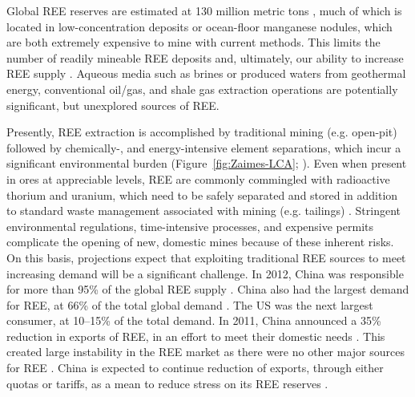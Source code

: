 Global REE reserves are estimated at 130 million metric tons \citep{USGS_commsumm}, much of which is located in low-concentration deposits or ocean-floor manganese nodules, which are both extremely expensive to mine with current methods.
This limits the number of readily mineable REE deposits and, ultimately, our ability to increase REE supply \citep{JRC_2011, Alonso_EST_2012}.
Aqueous media such as brines or produced waters from geothermal energy, conventional oil/gas, and shale gas extraction operations are potentially significant, but unexplored sources of REE.

Presently, REE extraction is accomplished by traditional mining (e.g. open-pit) followed by chemically-, and energy-intensive element separations, which incur a significant environmental burden (Figure~\ref{fig:Zaimes-LCA}; \citep{Zaimes_SCE_2015}).
Even when present in ores at appreciable levels, REE are commonly commingled with radioactive thorium and uranium, which need to be safely separated and stored in addition to standard waste management associated with mining (e.g. tailings) \citep{Gupta_IMR_1992, Sprecher_EST_2014}.
Stringent environmental regulations, time-intensive processes, and expensive permits complicate the opening of new, domestic mines because of these inherent risks.
On this basis, projections expect that exploiting traditional REE sources to meet increasing demand will be a significant challenge.
In 2012, China was responsible for more than 95\% of the global REE supply \citep{USGS_commsumm}.
China also had the largest demand for REE, at 66\% of the total global demand \citep{USGS_commsumm}.
The US was the next largest consumer, at 10--15\% of the total demand.
In 2011, China announced a 35\% reduction in exports of REE, in an effort to meet their domestic needs \citep{USGS_minyb_2012}.
This created large instability in the REE market as there were no other major sources for REE \citep{Alonso_EST_2012, Chakmour_Elem_2012, Hatch_Elem_2012}.
China is expected to continue reduction of exports, through either quotas or tariffs, as a mean to reduce stress on its REE reserves \citep{FrostSullivan_REEmarket, USGS_commsumm}.

